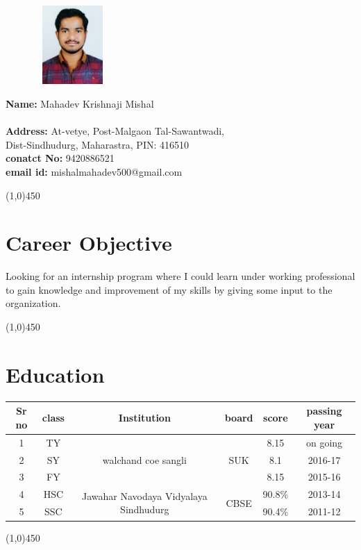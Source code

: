 \documentclass[10pt]{article}
\begin{document}
		\graphicspath{{photos/}}
	\begin{figure}
		\vspace{-20pt}
		\includegraphics[width=3cm,height=3cm]{photo.jpg}
	\end{figure}
\textbf{Name:} Mahadev Krishnaji Mishal\\\\
\textbf{Address:} At-vetye, Post-Malgaon Tal-Sawantwadi,\\
Dist-Sindhudurg, Maharastra, PIN: 416510\\
\textbf{conatct No:} 9420886521\\
\textbf{email id:} mishalmahadev500@gmail.com

\begin{center}
	\line(1,0){450}
\end{center}

\section{Career Objective}
Looking for an internship program where I could learn under working professional to gain knowledge and improvement of my skills by giving some input to the organization.

\begin{center}
	\line(1,0){450}
\end{center}

\section{Education}
\begin{tabular}{||c|c|c|c|c|c||}
	\hline
	Sr no & class & Institution & board & score&passing year \\
	\hline
	1 &TY& \multirow{3}{*}{ walchand coe sangli} & \multirow{3}{*}{ SUK} & 8.15&on going\\
	2 &SY& && 8.1&2016-17\\ 
	3 &FY& && 8.15&2015-16\\\hline 
	4 &HSC&\multirow{2}{*}{Jawahar Navodaya Vidyalaya Sindhudurg} & \multirow{2}{*}{CBSE}&90.8\%&2013-14\\ 
	5 &SSC& &&90.4\%&2011-12\\
	\hline
\end{tabular}
\begin{center}
	\line(1,0){450}
\end{center}
\end{document}
